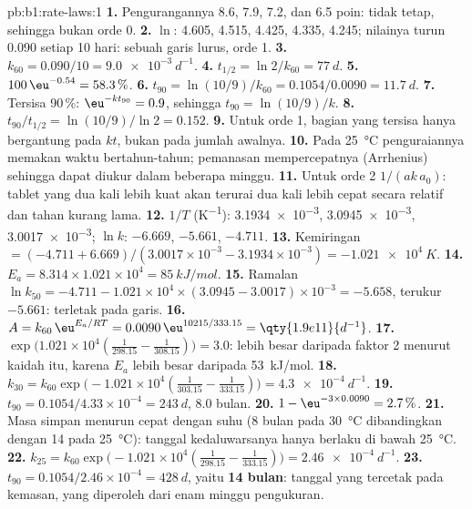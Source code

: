 \begin{solution}{pb:b1:rate-laws:1}
\textbf{1.} Pengurangannya 8.6, 7.9, 7.2, dan 6.5 poin: tidak tetap,
sehingga bukan orde 0.
\textbf{2.} $\ln$: 4.605, 4.515, 4.425, 4.335, 4.245; nilainya turun 0.090
setiap 10 hari: sebuah garis lurus, orde 1.
\textbf{3.} $k_{60} = 0.090/10 = \qty{9.0e-3}{d^{-1}}$.
\textbf{4.} $t_{1/2} = \ln2/k_{60} = \qty{77}{d}$.
\textbf{5.} $100\,\eu^{-0.54} = 58.3\,\%$.
\textbf{6.} $t_{90} = \ln(10/9)/k_{60} = 0.1054/0.0090 = \qty{11.7}{d}$.
\textbf{7.} Tersisa 90\,\%: $\eu^{-kt_{90}} = 0.9$, sehingga
$t_{90} = \ln(10/9)/k$.
\textbf{8.} $t_{90}/t_{1/2} = \ln(10/9)/\ln2 = 0.152$.
\textbf{9.} Untuk orde 1, bagian yang tersisa hanya bergantung pada $kt$,
bukan pada jumlah awalnya.
\textbf{10.} Pada \qty{25}{\celsius} penguraiannya memakan waktu
bertahun-tahun; pemanasan mempercepatnya (Arrhenius) sehingga dapat
diukur dalam beberapa minggu.
\textbf{11.} Untuk orde 2  $1/(ak\,a_0)$: tablet yang dua
kali lebih kuat akan terurai dua kali lebih cepat secara relatif dan
tahan kurang lama.
\textbf{12.} $1/T$ (\unit{K^{-1}}): \num{3.1934e-3}, \num{3.0945e-3},
\num{3.0017e-3}; $\ln k$: $-6.669$, $-5.661$, $-4.711$.
\textbf{13.} Kemiringan $= (-4.711 + 6.669)/(3.0017 \times 10^{-3} - 3.1934 \times
10^{-3}) = \qty{-1.021e4}{K}$.
\textbf{14.} $E_a = 8.314 \times 1.021 \times 10^4 = \qty{85}{kJ/mol}$.
\textbf{15.} Ramalan $\ln k_{50} = -4.711 - 1.021 \times 10^4 \times (3.0945 -
3.0017) \times 10^{-3} = -5.658$, terukur $-5.661$: terletak pada garis.
\textbf{16.} $A = k_{60}\,\eu^{E_a/RT} = 0.0090\,\eu^{10215/333.15} =
\qty{1.9e11}{d^{-1}}$.
\textbf{17.} $\exp\big(1.021 \times 10^4(\frac{1}{298.15} -
\frac{1}{308.15})\big) = 3.0$: lebih besar daripada faktor 2 menurut
kaidah itu, karena $E_a$ lebih besar daripada \qty{53}{kJ/mol}.
\textbf{18.} $k_{30} = k_{60}\exp\big(-1.021 \times 10^4(\frac{1}{303.15} -
\frac{1}{333.15})\big) = \qty{4.3e-4}{d^{-1}}$.
\textbf{19.} $t_{90} = 0.1054/4.33 \times 10^{-4} = \qty{243}{d}$, 8.0
bulan.
\textbf{20.} $1 - \eu^{-3 \times 0.0090} = 2.7\,\%$.
\textbf{21.} Masa simpan menurun cepat dengan suhu (8 bulan pada
\qty{30}{\celsius} dibandingkan dengan 14 pada \qty{25}{\celsius}):
tanggal kedaluwarsanya hanya berlaku di bawah \qty{25}{\celsius}.
\textbf{22.} $k_{25} = k_{60}\exp\big(-1.021 \times 10^4(\frac{1}{298.15} -
\frac{1}{333.15})\big) = \qty{2.46e-4}{d^{-1}}$.
\textbf{23.} $t_{90} = 0.1054/2.46 \times 10^{-4} = \qty{428}{d}$, yaitu
\textbf{14 bulan}: tanggal yang tercetak pada kemasan, yang diperoleh dari
enam minggu pengukuran.
\end{solution}
